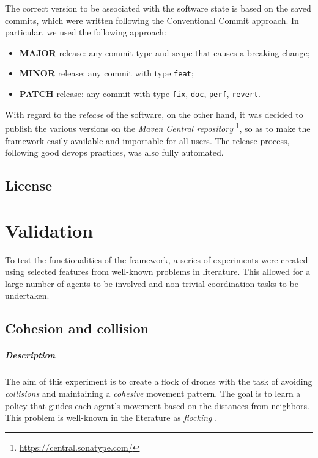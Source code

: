 \documentclass[12pt,a4paper,openright,twoside]{book}
\begin{document}
The correct version to be associated with the software state is based on the saved commits, 
    which were written following the Conventional Commit approach. In particular, we used the following approach:
    \begin{itemize}
        \item \textbf{MAJOR} release: any commit type and scope that causes a breaking change;
        \item \textbf{MINOR} release: any commit with type \texttt{feat};
        \item \textbf{PATCH} release: any commit with type \texttt{fix}, \texttt{doc}, \texttt{perf}, \texttt{revert}.
    \end{itemize}

With regard to the \emph{release} of the software, on the other hand, it was decided to publish the various versions 
    on the \emph{Maven Central repository} \footnote{\url{https://central.sonatype.com/}}, so as to make the framework easily available and importable for all users.  
    The release process, following good devops practices, was also fully automated.


\section{License}

\chapter{Validation} 
\label{chap:validation}
To test the functionalities of the framework, a series of experiments were created using selected 
    features from well-known problems in literature. This allowed for a large number of 
    agents to be involved and non-trivial coordination tasks to be undertaken.

\section{Cohesion and collision}

\paragraph{Description}
The aim of this experiment is to create a flock of drones with the task of avoiding \emph{collisions}
    and maintaining a \emph{cohesive} movement pattern. The goal is to learn a policy that guides each
    agent's movement based on the distances from neighbors.
    This problem is well-known in the literature as \emph{flocking} \cite{DBLP:conf/siggraph/Reynolds87,inverserl}.
\end{document}
